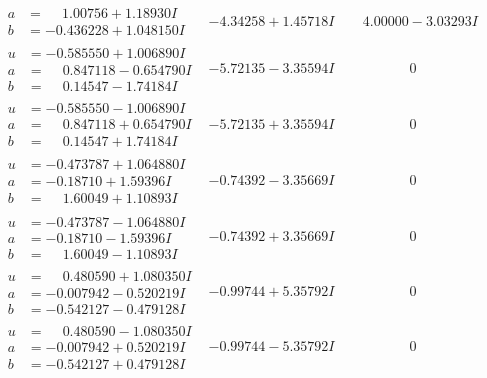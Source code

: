\documentclass[1p]{elsarticle_modified}
\theoremstyle{definition}
\begin{document}
$$\begin{array}{c|c|c}
\begin{aligned}
a &= \phantom{-}1.00756 + 1.18930 I \\
b &= -0.436228 + 1.048150 I\end{aligned}
 & -4.34258 + 1.45718 I & \phantom{-}4.00000 - 3.03293 I \\ \hline\begin{aligned}
u &= -0.585550 + 1.006890 I \\
a &= \phantom{-}0.847118 - 0.654790 I \\
b &= \phantom{-}0.14547 - 1.74184 I\end{aligned}
 & -5.72135 - 3.35594 I & \phantom{-0.000000 } 0 \\ \hline\begin{aligned}
u &= -0.585550 - 1.006890 I \\
a &= \phantom{-}0.847118 + 0.654790 I \\
b &= \phantom{-}0.14547 + 1.74184 I\end{aligned}
 & -5.72135 + 3.35594 I & \phantom{-0.000000 } 0 \\ \hline\begin{aligned}
u &= -0.473787 + 1.064880 I \\
a &= -0.18710 + 1.59396 I \\
b &= \phantom{-}1.60049 + 1.10893 I\end{aligned}
 & -0.74392 - 3.35669 I & \phantom{-0.000000 } 0 \\ \hline\begin{aligned}
u &= -0.473787 - 1.064880 I \\
a &= -0.18710 - 1.59396 I \\
b &= \phantom{-}1.60049 - 1.10893 I\end{aligned}
 & -0.74392 + 3.35669 I & \phantom{-0.000000 } 0 \\ \hline\begin{aligned}
u &= \phantom{-}0.480590 + 1.080350 I \\
a &= -0.007942 - 0.520219 I \\
b &= -0.542127 - 0.479128 I\end{aligned}
 & -0.99744 + 5.35792 I & \phantom{-0.000000 } 0 \\ \hline\begin{aligned}
u &= \phantom{-}0.480590 - 1.080350 I \\
a &= -0.007942 + 0.520219 I \\
b &= -0.542127 + 0.479128 I\end{aligned}
 & -0.99744 - 5.35792 I & \phantom{-0.000000 } 0 \\ \hline\begin{aligned}

\end{aligned}
\end{array}$$
\end{document}
